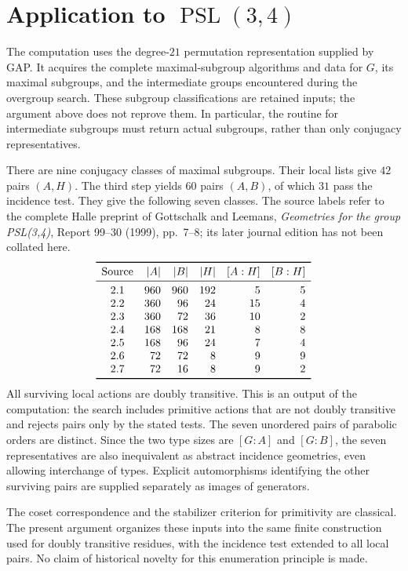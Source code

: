 \documentclass[11pt]{article}
\begin{document}
\section*{Application to $\operatorname{PSL}(3,4)$}
The computation uses the degree-$21$ permutation representation supplied
by GAP. It acquires the complete maximal-subgroup algorithms and data for
$G$, its maximal subgroups, and the intermediate groups encountered during
the overgroup search. These subgroup classifications are retained inputs;
the argument above does not reprove them. In particular, the routine for
intermediate subgroups must return actual subgroups, rather than only
conjugacy representatives.

There are nine conjugacy classes of maximal subgroups. Their local lists
give $42$ pairs $(A,H)$. The third step yields $60$ pairs $(A,B)$, of which
$31$ pass the incidence test. They give the following seven classes.
The source labels refer to the complete Halle preprint of Gottschalk and
Leemans, \emph{Geometries for the group PSL(3,4)}, Report 99--30 (1999),
pp.~7--8; its later journal edition has not been collated here.
\[
\begin{array}{crrrrr}
\toprule
\text{Source}&|A|&|B|&|H|&[A:H]&[B:H]\\
\midrule
2.1&960&960&192&5&5\\
2.2&360&96&24&15&4\\
2.3&360&72&36&10&2\\
2.4&168&168&21&8&8\\
2.5&168&96&24&7&4\\
2.6&72&72&8&9&9\\
2.7&72&16&8&9&2\\
\bottomrule
\end{array}
\]
All surviving local actions are doubly transitive. This is an output of
the computation: the search includes primitive actions that are not
doubly transitive and rejects pairs only by the stated tests. The seven
unordered pairs of parabolic orders are distinct. Since the two type
sizes are $[G:A]$ and $[G:B]$, the seven representatives are also
inequivalent as abstract incidence geometries, even allowing interchange
of types. Explicit automorphisms identifying the other surviving pairs
are supplied separately as images of generators.

The coset correspondence and the stabilizer criterion for primitivity
are classical. The present argument organizes these inputs into the same
finite construction used for doubly transitive residues, with the
incidence test extended to all local pairs. No claim of historical
novelty for this enumeration principle is made.
\end{document}
